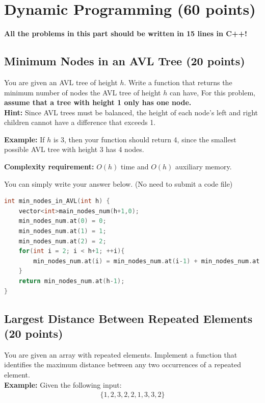 \documentclass[11pt]{exam}
\begin{document}
\newpage
\section{Dynamic Programming (60 points)}
\textbf{\huge\color{red}All the problems in this part should be written in 15 lines in C++!}
\subsection{Minimum Nodes in an AVL Tree (20 points)}
You are given an AVL tree of height $h$. Write a function that returns the minimum number of nodes the AVL tree of height $h$ can have, For this problem, \textbf{assume that a tree with height 1 only has one node.}\\

\textbf{Hint: }Since AVL trees must be balanced, the height of each node's left and right children cannot have a difference that exceeds 1. 

\textbf{Example: }If $h$ is 3, then your function should return 4, since the smallest possible AVL tree with height 3 has 4 nodes.

\textbf{Complexity requirement:} $O(h)$ time and $O(h)$ auxiliary memory.

You can simply write your answer below. (No need to submit a code file)

\begin{solution}
\begin{lstlisting}[language=c++]
int min_nodes_in_AVL(int h) {
    vector<int>main_nodes_num(h+1,0);
    min_nodes_num.at(0) = 0;
    min_nodes_num.at(1) = 1;
    min_nodes_num.at(2) = 2;
    for(int i = 2; i < h+1; ++i){
        min_nodes_num.at(i) = min_nodes_num.at(i-1) + min_nodes_num.at(i-2) + 1;
    }
    return min_nodes_num.at(h-1);
}
\end{lstlisting}
\end{solution}

\subsection{Largest Distance Between Repeated Elements (20 points)}
You are given an array with repeated elements. Implement a function that identifies the maximum distance between any two occurrences of a repeated element.\\

\textbf{Example:} Given the following input:
\begin{align*}
\{1,2,3,2,2,1,3,3,2\}
\end{align*}
\end{document}
